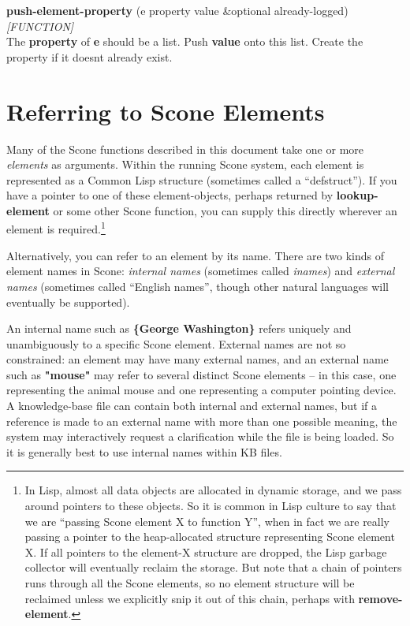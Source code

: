 \documentclass[titlepage,twoside,openright,11pt]{article}
\begin{document}
\textbf{push-element-property} (e property value \&optional
already-logged) \emph{{[}FUNCTION{]}}\\
The \textbf{property} of \textbf{e} should be a list. Push
\textbf{value} onto this list. Create the property if it
doesn\textquotesingle t already exist.

\section{\texorpdfstring{ Referring to Scone
Elements}{ Referring to Scone Elements}}\label{referring-to-scone-elements}

Many of the Scone functions described in this document take one or more
\emph{elements} as arguments. Within the running Scone system, each
element is represented as a Common Lisp structure (sometimes called a
``defstruct''). If you have a pointer to one of these element-objects,
perhaps returned by \textbf{lookup-element} or some other Scone
function, you can supply this directly wherever an element is
required.\footnote{In Lisp, almost all data objects are allocated in
  dynamic storage, and we pass around pointers to these objects. So it
  is common in Lisp culture to say that we are ``passing Scone element X
  to function Y'', when in fact we are really passing a pointer to the
  heap-allocated structure representing Scone element X. If all pointers
  to the element-X structure are dropped, the Lisp garbage collector
  will eventually reclaim the storage. But note that a chain of pointers
  runs through all the Scone elements, so no element structure will be
  reclaimed unless we explicitly snip it out of this chain, perhaps with
  \textbf{remove-element}.}

Alternatively, you can refer to an element by its name. There are two
kinds of element names in Scone: \emph{internal names} (sometimes called
\emph{inames}) and \emph{external names} (sometimes called ``English
names'', though other natural languages will eventually be supported).

An internal name such as \textbf{\{George Washington\}} refers uniquely
and unambiguously to a specific Scone element. External names are not so
constrained: an element may have many external names, and an external
name such as \textbf{"mouse"} may refer to several distinct Scone
elements -- in this case, one representing the animal mouse and one
representing a computer pointing device. A knowledge-base file can
contain both internal and external names, but if a reference is made to
an external name with more than one possible meaning, the system may
interactively request a clarification while the file is being loaded. So
it is generally best to use internal names within KB files.
\end{document}

